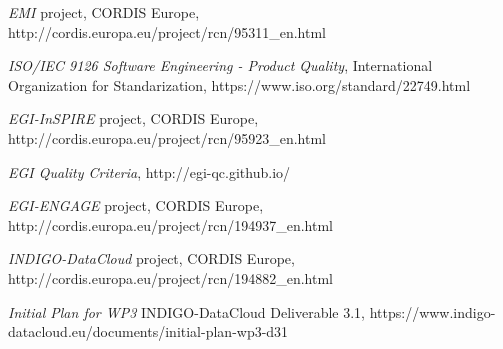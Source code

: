\documentclass[journal]{IEEEtran}
\begin{document}
\begin{thebibliography}{1}
\emph{EMI} project, CORDIS Europe, http://cordis.europa.eu/project/rcn/95311\_en.html

\emph{ISO/IEC 9126 Software Engineering - Product Quality}, International Organization for Standarization, https://www.iso.org/standard/22749.html

\emph{EGI-InSPIRE} project, CORDIS Europe, http://cordis.europa.eu/project/rcn/95923\_en.html

\emph{EGI Quality Criteria}, http://egi-qc.github.io/


\emph{EGI-ENGAGE} project, CORDIS Europe, http://cordis.europa.eu/project/rcn/194937\_en.html

\emph{INDIGO-DataCloud} project, CORDIS Europe, http://cordis.europa.eu/project/rcn/194882\_en.html


\emph{Initial Plan for WP3} INDIGO-DataCloud Deliverable 3.1, https://www.indigo-datacloud.eu/documents/initial-plan-wp3-d31

%

\end{thebibliography}



\end{document}
